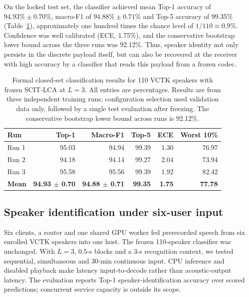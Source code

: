 \documentclass[final,5p,times,twocolumn]{elsarticle}
\begin{document}
On the locked test set, the classifier achieved mean Top-1 accuracy of $94.93\%\pm0.70\%$, macro-F1 of $94.88\%\pm0.71\%$ and Top-5 accuracy of 99.35\% (Table~\ref{tab:speaker}), approximately one hundred times the chance level of $1/110\approx0.9\%$. Confidence was well calibrated (ECE, 1.75\%), and the conservative bootstrap lower bound across the three runs was 92.12\%. Thus, speaker identity not only persists in the discrete payload itself, but can also be recovered at the receiver with high accuracy by a classifier that reads this payload from a frozen codec.

\begin{table}[t]
\centering
\caption{Formal closed-set classification results for 110 VCTK speakers with frozen SCIT-LCA at $L=3$. All entries are percentages. Results are from three independent training runs; configuration selection used validation data only, followed by a single test evaluation after freezing. The conservative bootstrap lower bound across runs is 92.12\%.}
\label{tab:speaker}
\scriptsize\setlength{\tabcolsep}{2pt}
\begin{tabular}{lrrrrr}
\toprule
Run & Top-1 & Macro-F1 & Top-5 & ECE & Worst 10\%\\
\midrule
Run 1 & 95.03 & 94.94 & 99.39 & 1.30 & 76.97\\
Run 2 & 94.18 & 94.14 & 99.27 & 2.04 & 73.94\\
Run 3 & 95.58 & 95.56 & 99.39 & 1.92 & 82.42\\
\textbf{Mean} & \textbf{94.93 $\pm$ 0.70} & \textbf{94.88 $\pm$ 0.71} & \textbf{99.35} & \textbf{1.75} & \textbf{77.78}\\
\bottomrule
\end{tabular}
\end{table}

\subsection{Speaker identification under six-user input}
Six clients, a router and one shared GPU worker fed prerecorded speech from six enrolled VCTK speakers into one host. The frozen 110-speaker classifier was unchanged. With $L=3$, 0.5-s blocks and a 3-s recognition context, we tested sequential, simultaneous and 30-min continuous input. CPU inference and disabled playback make latency input-to-decode rather than acoustic-output latency. The evaluation reports Top-1 speaker-identification accuracy over scored predictions; concurrent service capacity is outside its scope.
\end{document}
